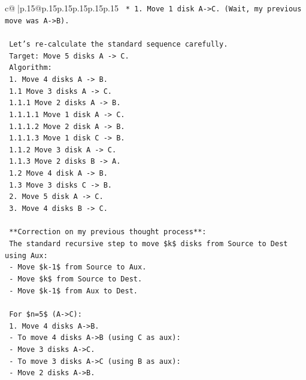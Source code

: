 \documentclass{article}
\begin{document}
{\begin{supertabular}{c@{$\;$}|p{.15\linewidth}@{}p{.15\linewidth}p{.15\linewidth}p{.15\linewidth}p{.15\linewidth}p{.15\linewidth}}
{{{\texttt{                    *   1. Move 1 disk A{-}>C. (Wait, my previous move was A{-}>B).} \\
\\ 
\texttt{    Let's re{-}calculate the standard sequence carefully.} \\
\texttt{    Target: Move 5 disks A {-}> C.} \\
\texttt{    Algorithm:} \\
\texttt{    1. Move 4 disks A {-}> B.} \\
\texttt{       1.1 Move 3 disks A {-}> C.} \\
\texttt{           1.1.1 Move 2 disks A {-}> B.} \\
\texttt{               1.1.1.1 Move 1 disk A {-}> C.} \\
\texttt{               1.1.1.2 Move 2 disk A {-}> B.} \\
\texttt{               1.1.1.3 Move 1 disk C {-}> B.} \\
\texttt{           1.1.2 Move 3 disk A {-}> C.} \\
\texttt{           1.1.3 Move 2 disks B {-}> A.} \\
\texttt{       1.2 Move 4 disk A {-}> B.} \\
\texttt{       1.3 Move 3 disks C {-}> B.} \\
\texttt{    2. Move 5 disk A {-}> C.} \\
\texttt{    3. Move 4 disks B {-}> C.} \\
\\ 
\texttt{    **Correction on my previous thought process**:} \\
\texttt{    The standard recursive step to move \$k\$ disks from Source to Dest using Aux:} \\
\texttt{    {-} Move \$k{-}1\$ from Source to Aux.} \\
\texttt{    {-} Move \$k\$ from Source to Dest.} \\
\texttt{    {-} Move \$k{-}1\$ from Aux to Dest.} \\
\\ 
\texttt{    For \$n=5\$ (A{-}>C):} \\
\texttt{    1. Move 4 disks A{-}>B.} \\
\texttt{       {-} To move 4 disks A{-}>B (using C as aux):} \\
\texttt{         {-} Move 3 disks A{-}>C.} \\
\texttt{           {-} To move 3 disks A{-}>C (using B as aux):} \\
\texttt{             {-} Move 2 disks A{-}>B.} \\
}}}
\end{supertabular}}
\end{document}

